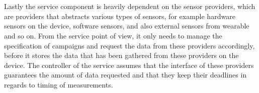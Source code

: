 \\\\
Lastly the service component is heavily dependent on the sensor providers, which are providers that abstracts various types of sensors, for example hardware sensors on the device, software sensors, and also external sensors from wearable and so on. From the service point of view, it only needs to manage the specification of campaigns and request the data from these providers accordingly, before it stores the data that has been gathered from these providers on the device. The controller of the service assumes that the interface of these providers guarantees the amount of data requested and that they keep their deadlines in regards to timing of measurements.